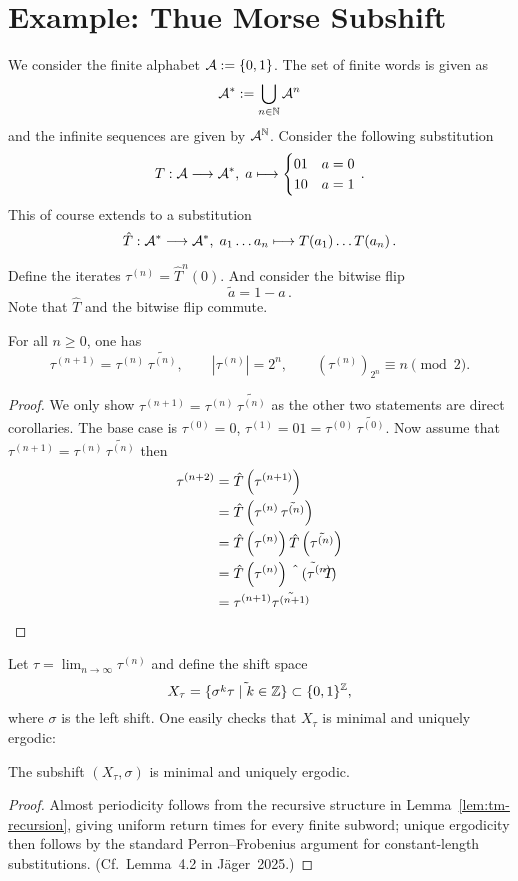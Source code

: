 \section{Example: Thue Morse Subshift}

We consider the finite alphabet $\mathcal{A} := \{ 0, 1 \}$.
The set of finite words is given as
\[ \mathcal{A}^* := \bigcup_{n\in\mathbb{N}} \mathcal{A}^n \]
and the infinite sequences are given by $\mathcal{A}^{\mathbb{N}}$.
Consider the following substitution
\[ T: \mathcal{A} \longrightarrow \mathcal{A}^*,\; a \longmapsto	\begin{cases} 01 & a=0 \\ 10 & a=1 \end{cases} \,.\]
This of course extends to a substitution
\[ \hat T: \mathcal{A}^* \longrightarrow \mathcal{A}^*,\; a_1\ldots a_n \longmapsto	T(a_1)\ldots T(a_n) \,. \]

Define the iterates $\tau^{(n)} = {\hat T}^n(0)$.
And consider the bitwise flip
\[ \tilde{a} = 1-a \,.\]
Note that $\hat T$ and the bitwise flip commute.

\begin{lemma}
	\label{lem:tm-recursion}
	For all $n \geqslant 0$, one has
	\[
	\tau^{(n+1)} = \tau^{(n)}\,\tilde{\tau^{(n)}},
	\qquad |\tau^{(n)}|=2^n,
	\qquad (\tau^{(n)})_{2^n}\equiv n\pmod2.
	\]
\end{lemma}
\begin{proof}
	We only show $\tau^{(n+1)} = \tau^{(n)}\,\tilde{\tau^{(n)}}$ as the other two statements are direct corollaries.
	The base case is $\tau^{(0)}=0$, $\tau^{(1)}=01=\tau^{(0)}\,\tilde{\tau^{(0)}}$.
	Now assume that 
	$\tau^{(n+1)} = \tau^{(n)}\,\tilde{\tau^{(n)}}$
	then
	\begin{align*}
		\tau^{(n+2)} &= \hat T\left(\tau^{(n+1)}\right)\\
		&= \hat T\left( \tau^{(n)}\,\tilde{\tau^{(n)}}\right)\\
		&= \hat T\left( \tau^{(n)} \right) \hat T\left(\tilde{\tau^{(n)}}\right)\\
		&= \hat T\left( \tau^{(n)} \right) \tilde{\hat T(\tau^{(n)})}\\
		&= \tau^{(n+1)} \tilde{\tau^{(n+1)}} \qedhere
	\end{align*}
\end{proof}

Let $\tau=\lim_{n\to\infty}\tau^{(n)}$ and define the shift space
\[
X_\tau = \tilde{\{\sigma^k \tau\mid k\in\mathbb{Z}\}}\subset\{0,1\}^{\mathbb{Z}},
\]
where $\sigma$ is the left shift.  One easily checks that $X_\tau$ is minimal and uniquely ergodic:
\begin{lemma}\label{lem:tm-ergodic}
The subshift $(X_\tau,\sigma)$ is minimal and uniquely ergodic.
\end{lemma}
\begin{proof}
Almost periodicity follows from the recursive structure in Lemma~\ref{lem:tm-recursion}, giving uniform return times for every finite subword; unique ergodicity then follows by the standard Perron–Frobenius argument for constant‑length substitutions.  (Cf. Lemma 4.2 in Jäger 2025.)
\end{proof}

